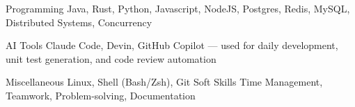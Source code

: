 

\begin{cvskills}

  \cvskill
    {Programming} %
    {Java, Rust, Python, Javascript, NodeJS, Postgres, Redis, MySQL, Distributed Systems, Concurrency} %

  \cvskill
    {AI Tools} %
    {Claude Code, Devin, GitHub Copilot — used for daily development, unit test generation, and code review automation} %

  \cvskill
    {Miscellaneous} %
    {Linux, Shell (Bash/Zsh), Git} %
  \cvskill
    {Soft Skills} %
    {Time Management, Teamwork, Problem-solving, Documentation} %

\end{cvskills}
